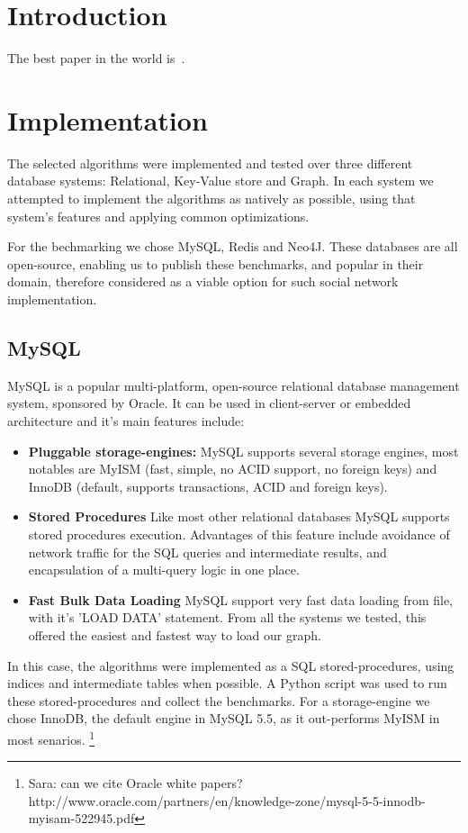 \section{Introduction}
The best paper in the world is~\cite{Liben-Nowell:2003:LPP:956863.956972}.



\section{Implementation}
The selected algorithms were implemented and tested over three different 
database systems: Relational, Key-Value store and Graph. 
In each system we attempted to implement the algorithms as natively as possible, 
using that system's features and applying common optimizations. 

For the bechmarking we chose MySQL, Redis and Neo4J.
These databases are all open-source, enabling us to publish these benchmarks,
and popular in their domain, therefore considered as a viable option for 
such social network implementation.

\subsection{MySQL}
MySQL is a popular multi-platform, open-source relational database management
system, sponsored by Oracle. It can be used in client-server or embedded
architecture and it's main features include: 
\begin{itemize}
	\item {\bf Pluggable storage-engines:} MySQL supports several storage engines, 
		most notables are MyISM (fast, simple, no ACID support, no foreign keys) and
		InnoDB (default, supports transactions, ACID and foreign keys).
	\item {\bf Stored Procedures} Like most other relational databases MySQL supports 
		stored procedures execution. Advantages of this feature include 
		avoidance of network traffic for the SQL queries and intermediate results,
		and encapsulation of a multi-query logic in one place.
	\item {\bf Fast Bulk Data Loading} MySQL support very fast data loading from file,
		with it's 'LOAD DATA' statement. From all the systems we tested, this offered 
		the easiest and fastest way to load our graph.
\end{itemize}

In this case, the algorithms were implemented as a SQL stored-procedures,
using indices and intermediate tables when possible. A Python script was used
to run these stored-procedures and collect the benchmarks. For a storage-engine 
we chose InnoDB, the default engine in MySQL 5.5, as it out-performs MyISM in 
most senarios. \footnote{Sara: can we cite Oracle white papers? 
http://www.oracle.com/partners/en/knowledge-zone/mysql-5-5-innodb-myisam-522945.pdf}
\linebreak

